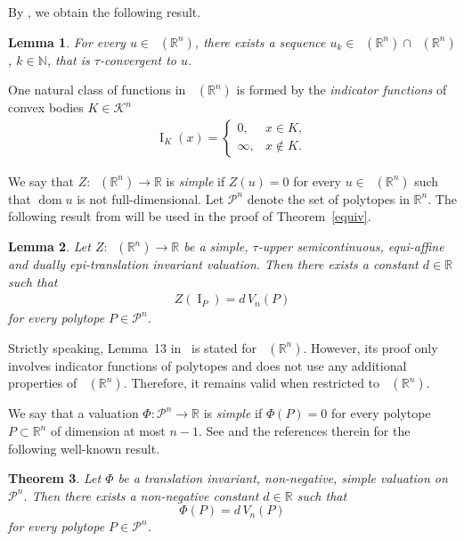 \documentclass[11pt]{article}
\newtheorem{teo}{Theorem}
\newtheorem{lema}[teo]{Lemma}
\theoremstyle{definition} %
\newcommand{\RR}{(\mathbb{R}^n)}
\DeclareMathOperator{\I}{I}
\DeclareMathOperator{\PA}{Conv_{p.a}}
\DeclareMathOperator{\dom}{dom}
\DeclareMathOperator{\LC}{Conv_{ld}}
\DeclareMathOperator{\LP}{Conv_{lp}}
\begin{document}
  

By \cite[Lemma 14]{baeta1d}, we obtain the following result.  


\begin{lema}\label{piecewise}
For every $u\in \LC\RR$, there exists a sequence $u_k\in \PA(\mathbb{R}^n)\cap \LP\RR$, $k\in\mathbb{N}$,  that is $\tau$-convergent to $u$.
\end{lema}


One natural class of functions in $\LC\RR$ is formed by the \textit{indicator functions} of convex bodies $K\in\mathcal{K}^n$
\begin{align*}
\I_K(x) = 
\begin{cases}
0,& x \in K,\\
\infty,& x \notin K.
\end{cases}
\end{align*}


We say that $Z: \LP\RR\rightarrow \mathbb R$ is  \textit{simple} if $Z(u)=0$ for every  $u\in \LP\RR$ such that $\dom u$ is not full-dimensional. Let $\mathcal{P}^n$ denote the set of polytopes in $\mathbb{R}^n$. The following result from \cite[Lemma 13]{baeta1d} will be used in the proof of Theorem~\ref{equiv}.




\begin{lema}\label{non-positive}
Let $Z: \LP\RR\rightarrow \mathbb R$ be  a simple, $\tau$-upper semicontinuous, equi-affine  and dually epi-translation invariant valuation. Then there exists a constant $d\in\mathbb{R}$ such that 
\begin{align*}
   Z(\I_P) = d\, V_n(P)
\end{align*}
for every polytope $P\in \mathcal{P}^n$.
\end{lema}



Strictly speaking, Lemma~13 in~\cite{baeta1d} is stated for $\LC(\mathbb{R}^n)$. However, its proof only involves indicator functions of polytopes and does not use any additional properties of $\LC(\mathbb{R}^n)$. Therefore, it remains valid when restricted to $\LP(\mathbb{R}^n)$.


 We say that a valuation $\Phi: \mathcal{P}^n\to \mathbb{R}$ is \textit{simple} if $\Phi(P)=0$ for every polytope $P\subset \mathbb{R}^n$ of dimension at most $n-1$.  See \cite[Theorem 14.1]{mullen2} and the references therein for the following well-known result.

\begin{teo}\label{mullen}
Let $\Phi$ be a translation invariant, non-negative, simple valuation on $\mathcal{P}^n$. 
Then there exists a non-negative constant $d \in \mathbb{R}$ such that
$$
    \Phi(P) = d\, V_n(P)
$$
for every polytope $P \in \mathcal{P}^n$.
\end{teo}
\end{document}

